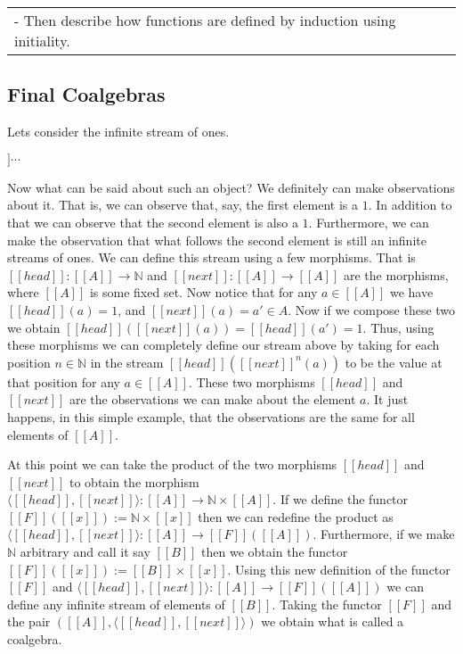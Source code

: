 \begin{tabular}{lll}
  - Then describe how functions are defined by induction using initiality.\\
\end{tabular}

\subsection{Final Coalgebras}
\label{subsec:final_coalgebras}
Lets consider the infinite stream of ones. 
\begin{center}
  \begin{math}
    [[1 :: 1 :: 1 :: 1]] \cdots
  \end{math}
\end{center}
Now what can be said about such an object?  We definitely can make observations about it.
That is, we can observe that, say, the first element is a $1$.  In addition to that we can 
observe that the second element is also a $1$.  Furthermore, we can make the observation 
that what follows the second element is still an infinite streams of ones.
We can define this stream using a few morphisms.  That is $[[head]] : [[A]] \to \mathbb{N}$ and
$[[next]] : [[A]] \to [[A]]$ are the morphisms, where $[[A]]$ is some fixed set.
Now notice that for any $a \in [[A]]$ we have $[[head]](a) = 1$, and 
$[[next]](a) = a' \in A$.  Now if we compose these two we obtain 
$[[head]]([[next]](a)) = [[head]](a') = 1$.  Thus, using these morphisms we can completely
define our stream above by taking for each position $n \in \mathbb{N}$ in the stream 
$[[head]]([[next]]^{n}(a))$ to be the value at that position for any $a \in [[A]]$.  These
two morphisms $[[head]]$ and $[[next]]$ are the observations we can make about the element 
$a$. It just happens, in this simple example, that the observations are the same for all 
elements of $[[A]]$.

At this point we can take the product of the two morphisms $[[head]]$ and $[[next]]$ to
obtain the morphism $\langle [[head]],[[next]] \rangle : [[A]] \to \mathbb{N} \times [[A]]$.
If we define the functor $[[F]]([[x]]) := \mathbb{N} \times [[x]]$ then we can redefine the
product as $\langle [[head]],[[next]] \rangle : [[A]] \to [[F]]([[A]])$.  Furthermore,
if we make $\mathbb{N}$ arbitrary and call it say $[[B]]$ then we obtain 
the functor $[[F]]([[x]]) := [[B]] \times [[x]]$.  Using this new definition of the functor
$[[F]]$ and $\langle [[head]],[[next]] \rangle : [[A]] \to [[F]]([[A]])$ we can define any
infinite stream of elements of $[[B]]$.  Taking the functor $[[F]]$ and the pair
$([[A]], \langle [[head]], [[next]] \rangle)$ we obtain what is called a coalgebra.

